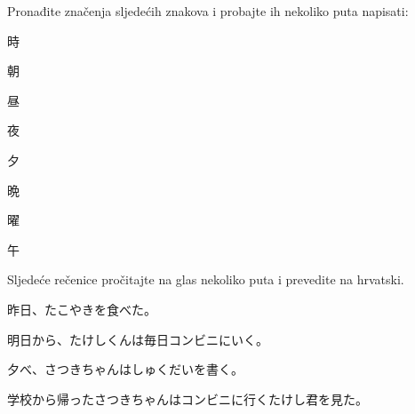 
\author{Ivan Petranović}

	
	\begin{mondai}{Pronađite značenja sljedećih znakova i probajte ih nekoliko puta napisati:}
		\item 時
		\item 朝
		\item 昼
		\item 夜
		\item 夕
		\item 晩
		\item 曜
		\item 午
	\end{mondai}

	\begin{mondai}{Sljedeće rečenice pročitajte na glas nekoliko puta i prevedite na hrvatski.}
		\item 昨日、たこやきを食べた。
		\item 明日から、たけしくんは毎日コンビニにいく。
		\item 夕べ、さつきちゃんはしゅくだいを書く。
		\item 学校から帰ったさつきちゃんはコンビニに行くたけし君を見た。
	\end{mondai}

